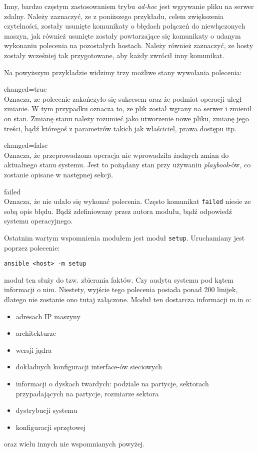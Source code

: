 Inny, bardzo częstym zastosowaniem trybu \textit{ad-hoc} jest wgrywanie pliku na serwer zdalny.
Należy zaznaczyć, ze z poniższego przykładu, celem zwiększenia czytelności, zostały usunięte komunikaty o błędach połączeń do niewłączonych maszyn, jak również usunięte zostały powtarzające się komunikaty o udanym wykonaniu polecenia na pozostałych hostach.
Należy również zaznaczyć, ze hosty zostały wcześniej tak przygotowane, aby każdy zwrócił inny komunikat.

Na powyższym przykładzie widzimy trzy możliwe stany wywołania polecenia:
\begin{description}
	\item{changed=true}\\
		Oznacza, ze polecenie zakończyło się sukcesem oraz że podmiot operacji uległ zmianie. W tym przypadku oznacza to, ze plik został wgrany na serwer i zmienił on stan.
		Zmianę stanu należy rozumieć jako utworzenie nowe pliku, zmianę jego treści, bądź któregoś z parametrów takich jak właściciel, prawa dostępu itp.
	\item{changed=false}\\
		Oznacza, że przeprowadzona operacja nie wprowadziła żadnych zmian do aktualnego stanu systemu.
		Jest to pożądany stan przy używaniu \textit{playbook}-ów, co zostanie opisane w następnej sekcji.
	\item{failed}\\
		Oznacza, że nie udało się wykonać polecenia.
		Często komunikat \texttt{failed} niesie ze sobą opis błędu. Bądź zdefiniowany przez autora modułu, bądź odpowiedź systemu operacyjnego.
\end{description}
Ostatnim wartym wspomnienia modułem jest moduł \texttt{setup}. Uruchamiany jest poprzez polecenie:
\begin{lstlisting}
ansible <host> -m setup
\end{lstlisting}
moduł ten służy do tzw. zbierania faktów.
Czy audytu systemu pod kątem informacji o nim.
Niestety, wyjście tego polecenia posiada ponad 200 linijek, dlatego nie zostanie ono tutaj załączone.
Moduł ten dostarcza informacji m.in o:
\begin{itemize}
	\item adresach IP maszyny
	\item architekturze
	\item wersji jądra
	\item dokładnych konfiguracji interface-ów sieciowych
	\item informacji o dyskach twardych: podziale na partycje, sektorach przypadających na partycje, rozmiarze sektora
	\item dystrybucji systemu
	\item konfiguracji sprzętowej
\end{itemize}
oraz wielu innych nie wspomnianych powyżej.

